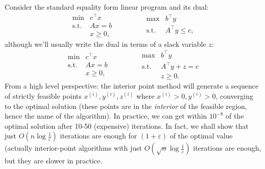 \documentclass{article}
\numberwithin{equation}{section}
\theoremstyle{definition}
\newcommand{\tst}{\text{s.t.}}
\begin{document}
Consider the standard equality form linear program and its dual:
\begin{equation}
    \begin{array}{cc}
         \min & c^\top x  \\
         \tst & Ax=b\\
              & x\ge 0,
    \end{array}\qquad\qquad
    \begin{array}{cc}
         \max & b^\top y  \\
         \tst & A^\top y\le c,\\
    \end{array}
\end{equation}
although we'll usually write the dual in terms of a slack variable $z$:
\begin{equation}
    \begin{array}{cc}
         \min & c^\top x  \\
         \tst & Ax=b\\
              & x\ge 0,
    \end{array}\qquad\qquad
    \begin{array}{cc}
         \max & b^\top y  \\
         \tst & A^\top y+z= c\\
              & z\ge 0.
    \end{array}
\end{equation}
From a high level perspective: the interior point method will generate a sequence of strictly feasible points $x^{(i)}, y^{(i)}, z^{(i)}$ where $x^{(i)}>0, y^{(i)}>0$, converging to the optimal solution (these points are in the \textit{interior} of the feasible region, hence the name of the algorithm). In practice, we can get within $10^{-8}$ of the optimal solution after 10-50 (expensive) iterations. In fact, we shall show that just $O( n\log{\frac1\varepsilon})$ iterations are enough for $(1+\varepsilon)$ of the optimal value (actually interior-point algorithms with just $O(\sqrt{n}\log{\frac1\varepsilon})$ iterations are enough, but they are slower in practice.
\end{document}
